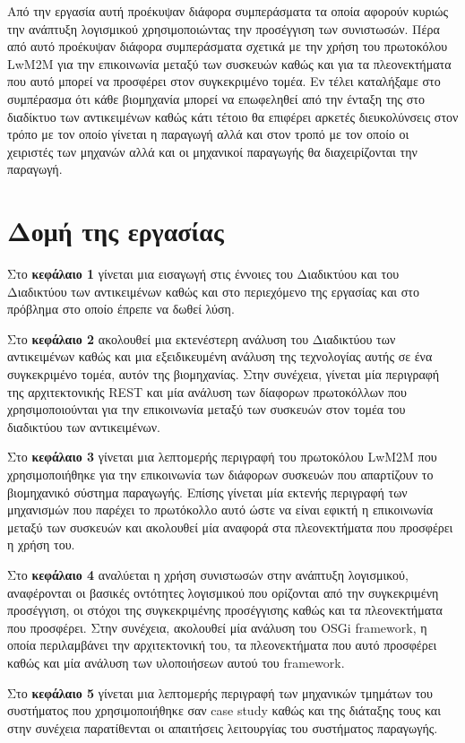 Από την εργασία αυτή προέκυψαν διάφορα συμπεράσματα τα οποία αφορούν κυριώς την ανάπτυξη λογισμικού χρησιμοποιώντας την προσέγγιση των συνιστωσών. Πέρα από αυτό προέκυψαν διάφορα συμπεράσματα σχετικά με την χρήση του πρωτοκόλου LwM2M για την επικοινωνία μεταξύ των συσκευών καθώς και για τα πλεονεκτήματα που αυτό μπορεί να προσφέρει στον συγκεκριμένο τομέα. Εν τέλει καταλήξαμε στο συμπέρασμα ότι κάθε βιομηχανία μπορεί να επωφεληθεί από την ένταξη της στο διαδίκτυο των αντικειμένων καθώς κάτι τέτοιο θα επιφέρει αρκετές διευκολύνσεις στον τρόπο με τον οποίο γίνεται η παραγωγή αλλά και στον τροπό με τον οποίο οι χειριστές των μηχανών αλλά και οι μηχανικοί παραγωγής θα διαχειρίζονται την παραγωγή. 

\section{Δομή της εργασίας}
Στο \textbf{κεφάλαιο 1} γίνεται μια εισαγωγή στις έννοιες του Διαδικτύου και του Διαδικτύου των αντικειμένων καθώς και στο περιεχόμενο της εργασίας και στο πρόβλημα στο οποίο έπρεπε να δωθεί λύση.

Στο \textbf{κεφάλαιο 2} ακολουθεί μια εκτενέστερη ανάλυση του Διαδικτύου των αντικειμένων καθώς και μια εξειδικευμένη ανάλυση της τεχνολογίας αυτής σε ένα συγκεκριμένο τομέα, αυτόν της βιομηχανίας. Στην συνέχεια, γίνεται μία περιγραφή της αρχιτεκτονικής REST και μία ανάλυση των δίαφορων πρωτοκόλλων που χρησιμοποιούνται για την επικοινωνία μεταξύ των συσκευών στον τομέα του διαδικτύου των αντικειμένων.
	
Στο \textbf{κεφάλαιο 3} γίνεται μια λεπτομερής περιγραφή του πρωτοκόλου LwM2M που χρησιμοποιήθηκε για την επικοινωνία των διάφορων συσκευών που απαρτίζουν το βιομηχανικό σύστημα παραγωγής. Επίσης γίνεται μία εκτενής περιγραφή των μηχανισμών που παρέχει το πρωτόκολλο αυτό ώστε να είναι εφικτή η επικοινωνία μεταξύ των συσκευών και ακολουθεί μία αναφορά στα πλεονεκτήματα που προσφέρει η χρήση του.

Στο \textbf{κεφάλαιο 4} αναλύεται η χρήση συνιστωσών στην ανάπτυξη λογισμικού, αναφέρονται οι βασικές οντότητες λογισμικού που ορίζονται από την συγκεκριμένη προσέγγιση, οι στόχοι της συγκεκριμένης προσέγγισης καθώς και τα πλεονεκτήματα που προσφέρει. Στην συνέχεια, ακολουθεί μία ανάλυση του  OSGi framework, η οποία περιλαμβάνει την αρχιτεκτονική του, τα πλεονεκτήματα που αυτό προσφέρει καθώς και μία ανάλυση των υλοποιήσεων αυτού του framework.


Στο \textbf{κεφάλαιο 5} γίνεται μια λεπτομερής περιγραφή των μηχανικών τμημάτων του συστήματος που χρησιμοποιήθηκε σαν case study καθώς και της διάταξης τους και στην συνέχεια παρατίθενται οι απαιτήσεις λειτουργίας του συστήματος παραγωγής. 


